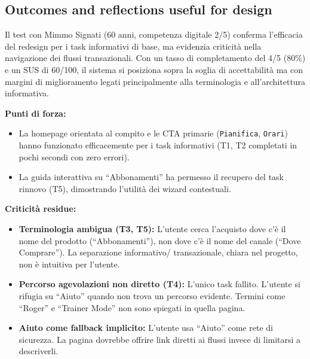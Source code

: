 ﻿\documentclass[11pt,a4paper]{article}
\begin{document}
\subsection*{Outcomes and reflections useful for design}
\begin{tcolorbox}[base]
Il test con Mimmo Signati (60 anni, competenza digitale
2/5) conferma l'efficacia del redesign per i task informativi
di base, ma evidenzia criticità nella navigazione dei flussi
transazionali. Con un tasso di completamento del 4/5 (80\%)
e un SUS di 60/100, il sistema si posiziona sopra la soglia
di accettabilità ma con margini di miglioramento legati
principalmente alla terminologia e all'architettura
informativa.

\medskip

\noindent\textbf{Punti di forza:}
\begin{itemize}[leftmargin=*]
  \item La homepage orientata al compito e le CTA primarie
  (\texttt{Pianifica}, \texttt{Orari}) hanno funzionato
  efficacemente per i task informativi (T1, T2 completati
  in pochi secondi con zero errori).
  \item La guida interattiva su ``Abbonamenti'' ha permesso
  il recupero del task rinnovo (T5), dimostrando l'utilità
  dei wizard contestuali.
\end{itemize}

\medskip

\noindent\textbf{Criticità residue:}
\begin{itemize}[leftmargin=*]
  \item \textbf{Terminologia ambigua (T3, T5):} L'utente
  cerca l'acquisto dove c'è il nome del prodotto
  (``Abbonamenti''), non dove c'è il nome del canale
  (``Dove Comprare''). La separazione informativo/
  transazionale, chiara nel progetto, non è intuitiva per
  l'utente.
  \item \textbf{Percorso agevolazioni non diretto (T4):}
  L'unico task fallito. L'utente si rifugia su ``Aiuto''
  quando non trova un percorso evidente. Termini come
  ``Roger'' e ``Trainer Mode'' non sono spiegati in quella
  pagina.
  \item \textbf{Aiuto come fallback implicito:} L'utente
  usa ``Aiuto'' come rete di sicurezza. La pagina dovrebbe
  offrire link diretti ai flussi invece di limitarsi a
  descriverli.
\end{itemize}

\medskip


\end{tcolorbox}
\end{document}
